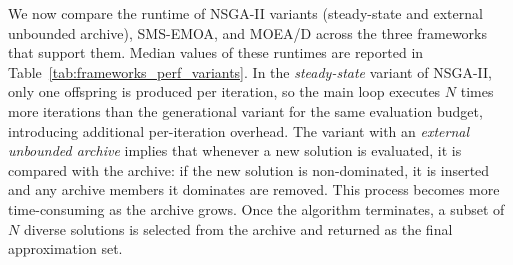 \documentclass[final,5p,times,twocolumn]{elsarticle}
\newcommand{\VAMOS}{VAMOS}
\begin{document}



We now compare the runtime of NSGA-II variants (steady-state and external unbounded archive), SMS-EMOA, and MOEA/D across the three frameworks that support them. Median values of these runtimes are reported in Table~\ref{tab:frameworks_perf_variants}. In the \textit{steady-state} variant of NSGA-II, only one offspring is produced per iteration, so the main loop executes $N$ times more iterations than the generational variant for the same evaluation budget, introducing additional per-iteration overhead. The variant with an \textit{external unbounded archive} implies that whenever a new solution is evaluated, it is compared with the archive: if the new solution is non-dominated, it is inserted and any archive members it dominates are removed. This process becomes more time-consuming as the archive grows. Once the algorithm terminates, a subset of $N$ diverse solutions is selected from the archive and returned as the final approximation set.
\end{document}
